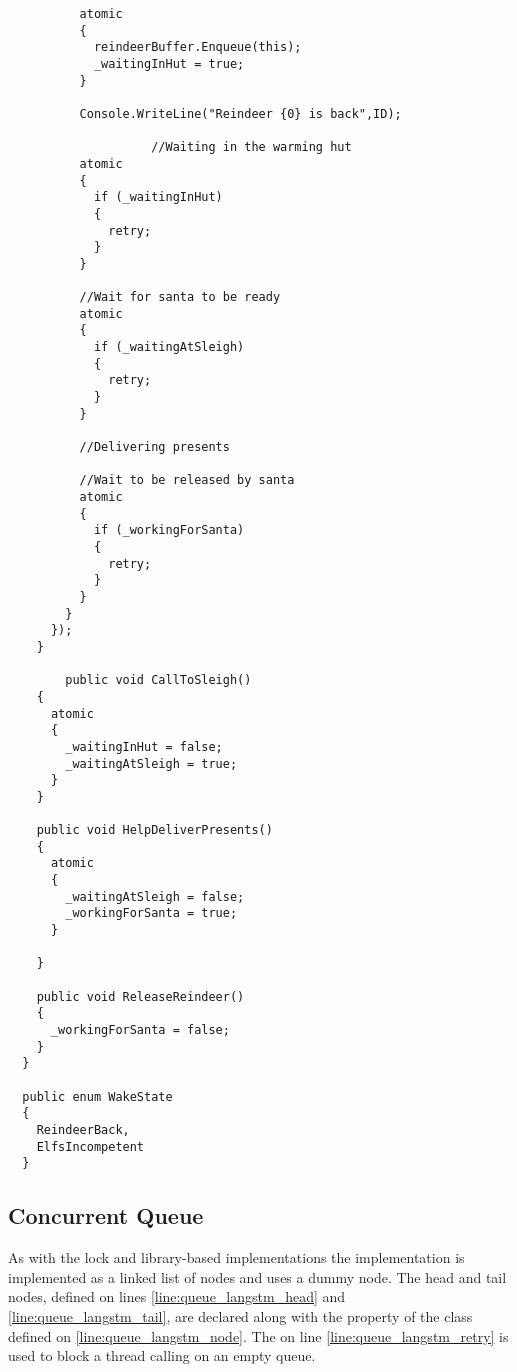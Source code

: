 \begin{lstlisting}
          atomic
          {
            reindeerBuffer.Enqueue(this);
            _waitingInHut = true;
          }

          Console.WriteLine("Reindeer {0} is back",ID);

                    //Waiting in the warming hut
          atomic
          {
            if (_waitingInHut)
            {
              retry;
            }
          }
                    
          //Wait for santa to be ready
          atomic
          {
            if (_waitingAtSleigh)
            {
              retry;
            }
          }

          //Delivering presents

          //Wait to be released by santa
          atomic
          {
            if (_workingForSanta)
            {
              retry;
            }
          } 
        }
      });
    }

        public void CallToSleigh()
    {
      atomic
      {
        _waitingInHut = false;
        _waitingAtSleigh = true;
      }
    }
        
    public void HelpDeliverPresents()
    {
      atomic
      {
        _waitingAtSleigh = false;
        _workingForSanta = true;
      }
       
    }

    public void ReleaseReindeer()
    {
      _workingForSanta = false;
    }
  }

  public enum WakeState
  {
    ReindeerBack,
    ElfsIncompetent
  }

\end{lstlisting}
\subsection{Concurrent Queue}
As with the lock and library-based implementations the \stmname implementation is implemented as a linked list of nodes and uses a dummy node. The head and tail nodes, defined on lines \ref{line:queue_langstm_head} and \ref{line:queue_langstm_tail}, are declared  along with the  property of the  class defined on \ref{line:queue_langstm_node}. The  on line \ref{line:queue_langstm_retry} is used to block a thread calling  on an empty queue.

